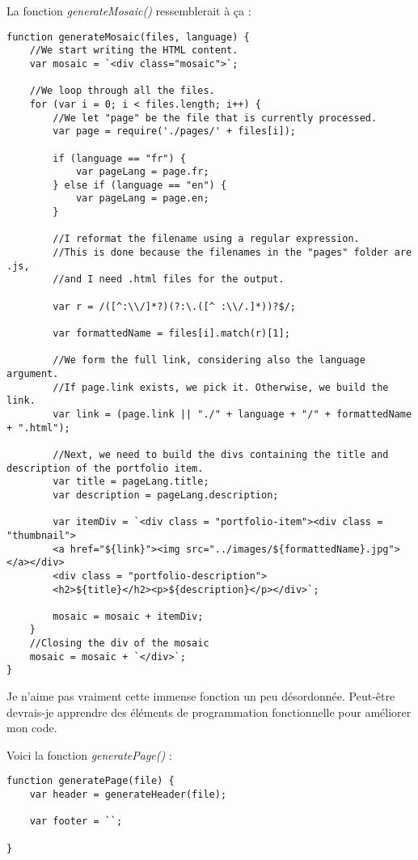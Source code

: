La fonction \textit{generateMosaic()} ressemblerait à ça :

\begin{lstlisting}
function generateMosaic(files, language) {
    //We start writing the HTML content.
    var mosaic = `<div class="mosaic">`;

    //We loop through all the files.
    for (var i = 0; i < files.length; i++) {
        //We let "page" be the file that is currently processed.
        var page = require('./pages/' + files[i]);

        if (language == "fr") {
            var pageLang = page.fr;
        } else if (language == "en") {
            var pageLang = page.en;
        }

        //I reformat the filename using a regular expression.
        //This is done because the filenames in the "pages" folder are .js,
        //and I need .html files for the output.

        var r = /([^:\\/]*?)(?:\.([^ :\\/.]*))?$/;

        var formattedName = files[i].match(r)[1];

        //We form the full link, considering also the language argument.
        //If page.link exists, we pick it. Otherwise, we build the link.
        var link = (page.link || "./" + language + "/" + formattedName + ".html");
        
        //Next, we need to build the divs containing the title and description of the portfolio item.
        var title = pageLang.title;
        var description = pageLang.description;

        var itemDiv = `<div class = "portfolio-item"><div class = "thumbnail">
        <a href="${link}"><img src="../images/${formattedName}.jpg"></a></div>
        <div class = "portfolio-description">
        <h2>${title}</h2><p>${description}</p></div>`; 
        
        mosaic = mosaic + itemDiv;
    }
    //Closing the div of the mosaic
    mosaic = mosaic + `</div>`;
}
\end{lstlisting}

Je n'aime pas vraiment cette immense fonction un peu désordonnée. Peut-être devrais-je apprendre des éléments de programmation fonctionnelle pour améliorer mon code.

Voici la fonction \textit{generatePage()} : 

\begin{lstlisting}
function generatePage(file) {
    var header = generateHeader(file);

    var footer = ``;

}
\end{lstlisting}

